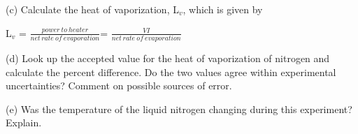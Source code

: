 (c) Calculate the heat of vaporization, L\( _{v} \), which is given
by

{\centering L\( _{v} \) = \( \frac{power\: to\: heater}{net\, rate\: of\: evaporation} \)=
\( \frac{VI}{net\, rate\: of\: evaporation} \)\par}
\vspace{30mm}

(d) Look up the accepted value for the heat of vaporization of nitrogen
and calculate the percent difference. Do the two values agree within
experimental uncertainties? Comment on possible sources of error.
\vspace{20mm}

(e) Was the temperature of the liquid nitrogen changing during this
experiment? Explain.
